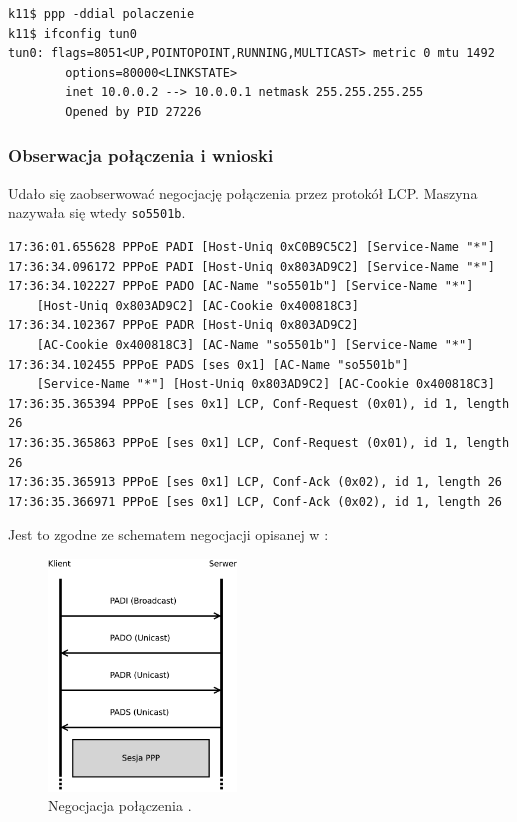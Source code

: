 \begin{lstlisting}
k11$ ppp -ddial polaczenie
k11$ ifconfig tun0
tun0: flags=8051<UP,POINTOPOINT,RUNNING,MULTICAST> metric 0 mtu 1492
        options=80000<LINKSTATE>
        inet 10.0.0.2 --> 10.0.0.1 netmask 255.255.255.255
        Opened by PID 27226
\end{lstlisting}


\subsubsection{Obserwacja połączenia i wnioski}

Udało się zaobserwować negocjację połączenia przez protokół LCP. Maszyna
\pppserv{} nazywała się wtedy \texttt{so5501b}.

\begin{lstlisting}
17:36:01.655628 PPPoE PADI [Host-Uniq 0xC0B9C5C2] [Service-Name "*"]
17:36:34.096172 PPPoE PADI [Host-Uniq 0x803AD9C2] [Service-Name "*"]
17:36:34.102227 PPPoE PADO [AC-Name "so5501b"] [Service-Name "*"]
    [Host-Uniq 0x803AD9C2] [AC-Cookie 0x400818C3]
17:36:34.102367 PPPoE PADR [Host-Uniq 0x803AD9C2]
    [AC-Cookie 0x400818C3] [AC-Name "so5501b"] [Service-Name "*"]
17:36:34.102455 PPPoE PADS [ses 0x1] [AC-Name "so5501b"]
    [Service-Name "*"] [Host-Uniq 0x803AD9C2] [AC-Cookie 0x400818C3]
17:36:35.365394 PPPoE [ses 0x1] LCP, Conf-Request (0x01), id 1, length 26
17:36:35.365863 PPPoE [ses 0x1] LCP, Conf-Request (0x01), id 1, length 26
17:36:35.365913 PPPoE [ses 0x1] LCP, Conf-Ack (0x02), id 1, length 26
17:36:35.366971 PPPoE [ses 0x1] LCP, Conf-Ack (0x02), id 1, length 26
\end{lstlisting}

Jest to zgodne ze schematem negocjacji opisanej w \cite{ppp:stevens-pppoe}:

\begin{figure}[h!]
  \centering
  \includegraphics[width=5cm]{figury/ppp/padi-pado.pdf}
  \caption{Negocjacja połączenia \ppp.}
  \label{fig:ppp:schemat-sieci-przed}
\end{figure}

